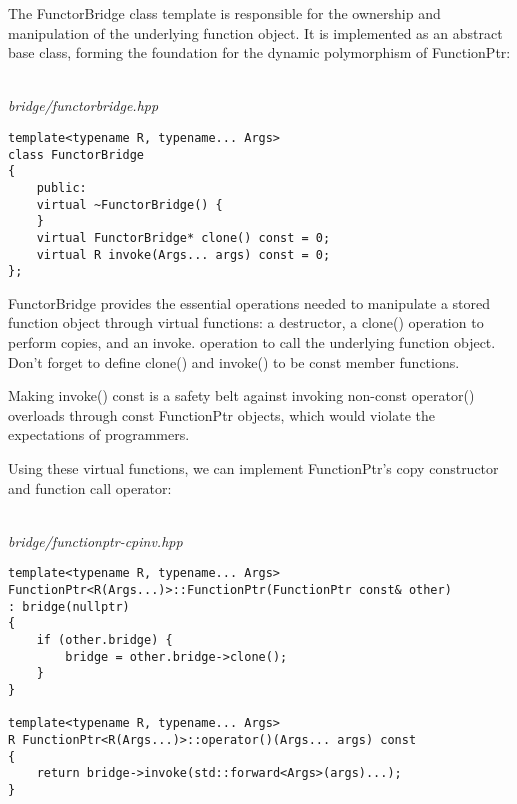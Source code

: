The FunctorBridge class template is responsible for the ownership and manipulation of the underlying function object. It is implemented as an abstract base class, forming the foundation for the dynamic polymorphism of FunctionPtr:

\hspace*{\fill} \\ %
\noindent
\textit{bridge/functorbridge.hpp}
\begin{lstlisting}[style=styleCXX]
template<typename R, typename... Args>
class FunctorBridge
{
	public:
	virtual ~FunctorBridge() {
	}
	virtual FunctorBridge* clone() const = 0;
	virtual R invoke(Args... args) const = 0;
};
\end{lstlisting}

FunctorBridge provides the essential operations needed to manipulate a stored function object through virtual functions: a destructor, a clone() operation to perform copies, and an invoke. operation to call the underlying function object. Don’t forget to define clone() and invoke() to be const member functions.

\begin{tcolorbox}[colback=webgreen!5!white,colframe=webgreen!75!black]
\hspace*{0.75cm}Making invoke() const is a safety belt against invoking non-const operator() overloads through const FunctionPtr objects, which would violate the expectations of programmers.
\end{tcolorbox}

Using these virtual functions, we can implement FunctionPtr’s copy constructor and function call operator:

\hspace*{\fill} \\ %
\noindent
\textit{bridge/functionptr-cpinv.hpp}
\begin{lstlisting}[style=styleCXX]
template<typename R, typename... Args>
FunctionPtr<R(Args...)>::FunctionPtr(FunctionPtr const& other)
: bridge(nullptr)
{
	if (other.bridge) {
		bridge = other.bridge->clone();
	}
}

template<typename R, typename... Args>
R FunctionPtr<R(Args...)>::operator()(Args... args) const
{
	return bridge->invoke(std::forward<Args>(args)...);
}
\end{lstlisting}














































